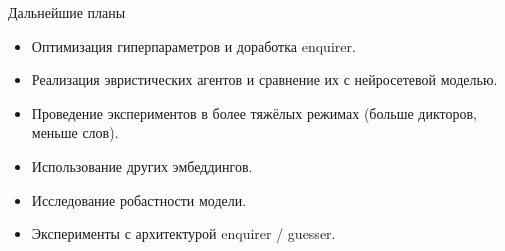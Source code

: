 \documentclass{beamer}
\begin{document}
\begin{frame}{Дальнейшие планы}
    \begin{itemize}
        \item Оптимизация гиперпараметров и доработка enquirer.
        \item Реализация эвристических агентов и сравнение их с нейросетевой
              моделью.
        \item Проведение экспериментов в более тяжёлых режимах (больше дикторов,
              меньше слов).
        \item Использование других эмбеддингов.
        \item Исследование робастности модели.
        \item Эксперименты с архитектурой enquirer / guesser.
    \end{itemize}
\end{frame}
\end{document}
